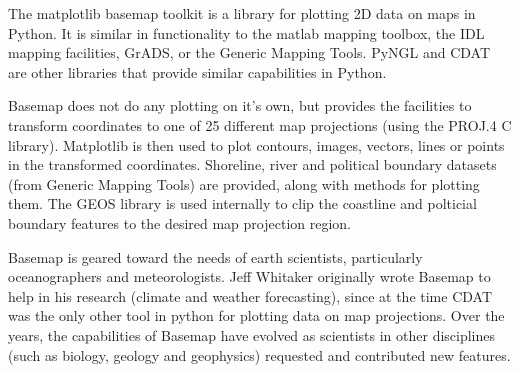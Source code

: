 The matplotlib basemap toolkit is a library for plotting 2D data on maps in Python. It is similar in functionality to the matlab mapping toolbox, the IDL mapping facilities, GrADS, or the Generic Mapping Tools. PyNGL and CDAT are other libraries that provide similar capabilities in Python.

Basemap does not do any plotting on it’s own, but provides the facilities to transform coordinates to one of 25 different map projections (using the PROJ.4 C library). Matplotlib is then used to plot contours, images, vectors, lines or points in the transformed coordinates. Shoreline, river and political boundary datasets (from Generic Mapping Tools) are provided, along with methods for plotting them. The GEOS library is used internally to clip the coastline and polticial boundary features to the desired map projection region.

Basemap is geared toward the needs of earth scientists, particularly oceanographers and meteorologists. Jeff Whitaker originally wrote Basemap to help in his research (climate and weather forecasting), since at the time CDAT was the only other tool in python for plotting data on map projections. Over the years, the capabilities of Basemap have evolved as scientists in other disciplines (such as biology, geology and geophysics) requested and contributed new features.

